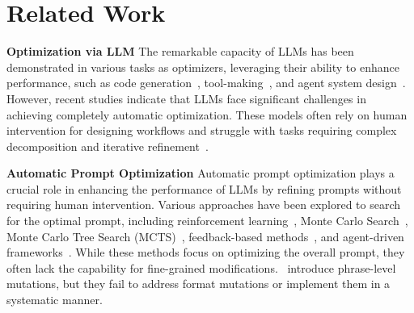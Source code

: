 \section{Related Work}

\noindent \textbf{Optimization via LLM}
The remarkable capacity of LLMs has been demonstrated in various tasks as optimizers, leveraging their ability to enhance performance, such as code generation~\citep{A_2023_optimize_code, C_2024COLM_stop, A_2024_MAGIC}, tool-making~\citep{A_2024_tool_making}, and agent system design~\citep{hu2024automateddesignagenticsystems}. 
However, recent studies indicate that LLMs face significant challenges in achieving completely automatic optimization. These models often rely on human intervention for designing workflows and struggle with tasks requiring complex decomposition and iterative refinement~\citep{A_2024_AFlow,J_2024TMLR_moreagent}.


\noindent \textbf{Automatic Prompt Optimization}
Automatic prompt optimization plays a crucial role in enhancing the performance of LLMs by refining prompts without requiring human intervention. 
Various approaches have been explored to search for the optimal prompt, including reinforcement learning~\citep{C_2023ICLR_TEMPERA}, Monte Carlo Search~\citep{zhou2023ape}, Monte Carlo Tree Search (MCTS)~\citep{C_2024ICLR_promptagent}, feedback-based methods~\citep{C_2023EMNLP_APO, A_2024_GReaTer}, and agent-driven frameworks~\citep{A_2024_LangGPT,C_2024ICLR_DSPy,O_2023_Autogpt}.
While these methods focus on optimizing the overall prompt, they often lack the capability for fine-grained modifications.~\citep{C_2024ICLR_DSPy,C_2024EMNLP_sammo} introduce phrase-level mutations, but they fail to address format mutations or implement them in a systematic manner.



